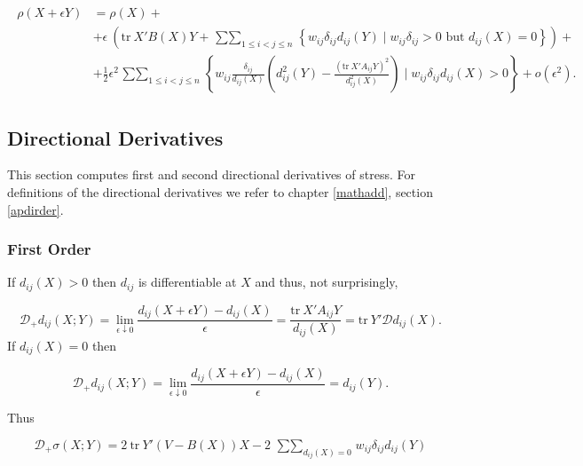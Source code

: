 \documentclass[
  12pt,
]{book}
\theoremstyle{definition}
\theoremstyle{definition}
\theoremstyle{definition}
\theoremstyle{definition}
\theoremstyle{remark}
\begin{document}
\begin{align}
\begin{split}
\rho(X+\epsilon Y)&=
\rho(X)+\\
&+\epsilon\ \left(\text{tr}\ X'B(X)Y+
\mathop{\sum\sum}_{1\leq i<j\leq n}\left\{w_{ij}\delta_{ij}d_{ij}(Y)\mid w_{ij}\delta_{ij}>0\text{ but }d_{ij}(X)=0\right\}\right)+\\
&+\frac12\epsilon^2\mathop{\sum\sum}_{1\leq i<j\leq n}\left\{w_{ij}\frac{\delta_{ij}}{d_{ij}(X)}\left(d_{ij}^2(Y)-\frac{(\text{tr}\ X'A_{ij}Y)^2}{d_{ij}^2(X)}\right)\mid w_{ij}\delta_{ij}d_{ij}(X)>0\right\}+o(\epsilon^2).
\end{split}
\label{eq:propexprho}
\end{align}

\hypertarget{propdirderivs}{%
\subsection{Directional Derivatives}\label{propdirderivs}}

This section computes first and second directional derivatives of stress. For definitions of the directional derivatives we refer to chapter \ref{mathadd}, section \ref{apdirder}.

\hypertarget{first-order-1}{%
\subsubsection{First Order}\label{first-order-1}}

If \(d_{ij}(X)>0\) then \(d_{ij}\) is differentiable at \(X\) and thus, not surprisingly,

\begin{equation}
\mathcal{D}_+d_{ij}(X;Y)=\lim_{\epsilon\downarrow 0}\frac{d_{ij}(X+\epsilon Y)-d_{ij}(X)}{\epsilon}=\frac{\text{tr}\ X'A_{ij}Y}{d_{ij}(X)}=\text{tr}\ Y'\mathcal{D}d_{ij}(X).
\label{eq:propdddpos}
\end{equation}
If \(d_{ij}(X)=0\) then

\begin{equation}
\mathcal{D}_+d_{ij}(X;Y)=\lim_{\epsilon\downarrow 0}\frac{d_{ij}(X+\epsilon Y)-d_{ij}(X)}{\epsilon}=d_{ij}(Y).
\label{eq:propdddzero}
\end{equation}

Thus

\begin{equation}
\mathcal{D}_+\sigma(X;Y)=2\ \text{tr}\ Y'(V-B(X))X-2\ \mathop{\sum\sum}_{d_{ij}(X)=0}w_{ij}\delta_{ij}d_{ij}(Y)
\label{eq:propddstress}
\end{equation}
\end{document}
